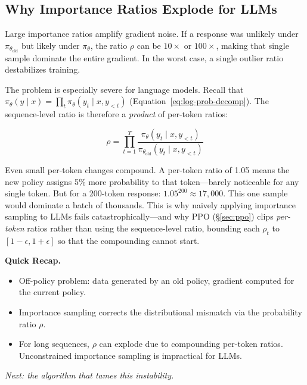 \subsection{Why Importance Ratios Explode for LLMs}

Large importance ratios amplify gradient noise. If a response was unlikely under $\pi_{\theta_{\text{old}}}$ but likely under $\pi_\theta$, the ratio $\rho$ can be $10\times$ or $100\times$, making that single sample dominate the entire gradient. In the worst case, a single outlier ratio destabilizes training.

The problem is especially severe for language models. Recall that $\pi_\theta(y \mid x) = \prod_t \pi_\theta(y_t \mid x, y_{<t})$ (Equation~\ref{eq:log-prob-decomp}). The sequence-level ratio is therefore a \emph{product} of per-token ratios:

\[
\rho = \prod_{t=1}^{T} \frac{\pi_\theta(y_t \mid x, y_{<t})}{\pi_{\theta_{\text{old}}}(y_t \mid x, y_{<t})}
\]

Even small per-token changes compound. A per-token ratio of 1.05 means the new policy assigns 5\% more probability to that token---barely noticeable for any single token. But for a 200-token response: $1.05^{200} \approx 17{,}000$. This one sample would dominate a batch of thousands. This is why naively applying importance sampling to LLMs fails catastrophically---and why PPO (\S\ref{sec:ppo}) clips \emph{per-token} ratios rather than using the sequence-level ratio, bounding each $\rho_t$ to $[1{-}\epsilon, 1{+}\epsilon]$ so that the compounding cannot start.

\noindent{}

\begin{quickrecap}
\textbf{Quick Recap.}
\begin{itemize}[nosep,leftmargin=1.5em]
  \item Off-policy problem: data generated by an old policy, gradient computed for the current policy.
  \item Importance sampling corrects the distributional mismatch via the probability ratio $\rho$.
  \item For long sequences, $\rho$ can explode due to compounding per-token ratios. Unconstrained importance sampling is impractical for LLMs.
\end{itemize}
\textit{Next: the algorithm that tames this instability.}
\end{quickrecap}


